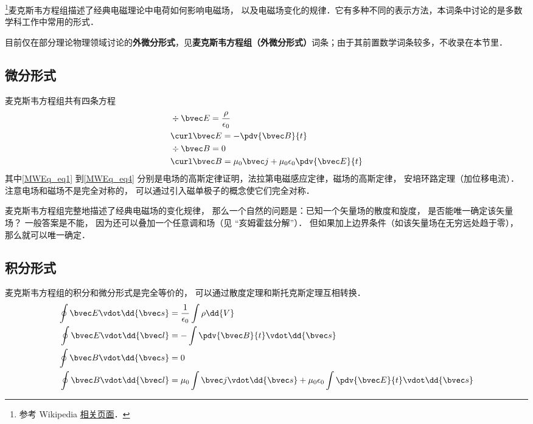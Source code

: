 
\begin{issues}
\issueDraft
\end{issues}

\footnote{参考 Wikipedia \href{https://en.wikipedia.org/wiki/Maxwell's_equations}{相关页面}．}麦克斯韦方程组描述了经典电磁理论中电荷如何影响电磁场， 以及电磁场变化的规律．它有多种不同的表示方法，本词条中讨论的是多数学科工作中常用的形式．

目前仅在部分理论物理领域讨论的\textbf{外微分形式}，见\textbf{麦克斯韦方程组（外微分形式）}词条；由于其前置数学词条较多，不收录在本节里．

\subsection{微分形式}
麦克斯韦方程组共有四条方程
\begin{align}
\label{MWEq_eq1}
&\div \bvec E = \frac{\rho}{\epsilon_0}\\
\label{MWEq_eq2}
&\curl \bvec E = -\pdv{\bvec B}{t}\\
\label{MWEq_eq3}
&\div \bvec B = 0 \\
\label{MWEq_eq4}
&\curl \bvec B = \mu_0 \bvec j + \mu_0\epsilon_0 \pdv{\bvec E}{t}
\end{align}
其中\autoref{MWEq_eq1} 到\autoref{MWEq_eq4} 分别是电场的高斯定律证明，法拉第电磁感应定律，磁场的高斯定律， 安培环路定理（加位移电流）．%
注意电场和磁场不是完全对称的， 可以通过引入磁单极子的概念使它们完全对称．

麦克斯韦方程组完整地描述了经典电磁场的变化规律， 那么一个自然的问题是：已知一个矢量场的散度和旋度， 是否能唯一确定该矢量场？ 一般答案是不能， 因为还可以叠加一个任意调和场（见 “亥姆霍兹分解”）． 但如果加上边界条件（如该矢量场在无穷远处趋于零）， 那么就可以唯一确定．

\subsection{积分形式}
麦克斯韦方程组的积分和微分形式是完全等价的， 可以通过散度定理和斯托克斯定理互相转换．
\begin{align}
\oint \bvec E \vdot \dd{\bvec s} &= \frac{1}{\epsilon_0}\int \rho \dd{V}\\
\oint \bvec E \vdot \dd{\bvec l} &= -\int \pdv{\bvec B}{t} \vdot \dd{\bvec s}\\
\oint \bvec B \vdot \dd{\bvec s} &= 0\\
\oint \bvec B \vdot \dd{\bvec l} &= \mu_0 \int \bvec j \vdot \dd{\bvec s} + \mu_0 \epsilon_0 \int \pdv{\bvec E}{t} \vdot \dd{\bvec s}
\end{align}

